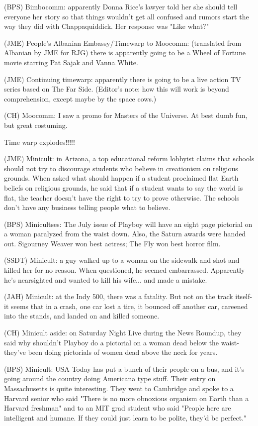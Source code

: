 \documentclass[12pt]{article}
\begin{document}
(BPS) Bimbocomm: apparently Donna Rice's lawyer told her she should tell everyone her story so that things wouldn't get all confused and rumors start the way they did with Chappaquiddick. Her response was "Like what?"

(JME) People's Albanian Embassy/Timewarp to Moocomm: (translated from Albanian by JME for RJG) there is apparently going to be a Wheel of Fortune movie starring Pat Sajak and Vanna White.

(JME) Continuing timewarp: apparently there is going to be a live action TV series based on The Far Side. (Editor's note: how this will work is beyond comprehension, except maybe by the space cows.)

(CH) Moocomm: I saw a promo for Masters of the Universe. At best dumb fun, but great costuming.

Time warp explodes!!!!!

(JME) Minicult: in Arizona, a top educational reform lobbyist claims that schools should not try to discourage students who believe in creationism on religious grounds. When asked what should happen if a student proclaimed flat Earth beliefs on religious grounds, he said that if a student wants to say the world is flat, the teacher doesn't have the right to try to prove otherwise. The schools don't have any business telling people what to believe.

(BPS) Minicultses: The July issue of Playboy will have an eight page pictorial on a woman paralyzed from the waist down. Also, the Saturn awards were handed out. Sigourney Weaver won best actress; The Fly won best horror film.

(SSDT) Minicult: a guy walked up to a woman on the sidewalk and shot and killed her for no reason. When questioned, he seemed embarrassed. Apparently he's nearsighted and wanted to kill his wife... and made a mistake.

(JAH) Minicult: at the Indy 500, there was a fatality. But not on the track itself- it seems that in a crash, one car lost a tire, it bounced off another car, careened into the stands, and landed on and killed someone.

(CH) Minicult aside: on Saturday Night Live during the News Roundup, they said why shouldn't Playboy do a pictorial on a woman dead below the waist- they've been doing pictorials of women dead above the neck for years.

(BPS) Minicult: USA Today has put a bunch of their people on a bus, and it's going around the country doing Americana type stuff. Their entry on Massachusetts is quite interesting. They went to Cambridge and spoke to a Harvard senior who said "There is no more obnoxious organism on Earth than a Harvard freshman" and to an MIT grad student who said "People here are intelligent and humane. If they could just learn to be polite, they'd be perfect."
\end{document}

